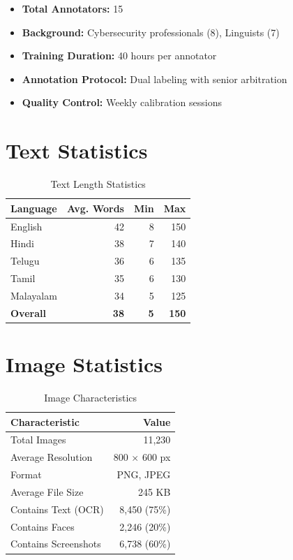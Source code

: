 \documentclass[10pt,a4paper]{article}
\begin{document}
\begin{itemize}
\item \textbf{Total Annotators:} 15
\item \textbf{Background:} Cybersecurity professionals (8), Linguists (7)
\item \textbf{Training Duration:} 40 hours per annotator
\item \textbf{Annotation Protocol:} Dual labeling with senior arbitration
\item \textbf{Quality Control:} Weekly calibration sessions
\end{itemize}

\section{Text Statistics}

\begin{table}[h]
\centering
\caption{Text Length Statistics}
\begin{tabular}{lrrr}
\toprule
\rowcolor{headerblue}
\textbf{Language} & \textbf{Avg. Words} & \textbf{Min} & \textbf{Max} \\
\midrule
English   & 42 & 8  & 150 \\
Hindi     & 38 & 7  & 140 \\
Telugu    & 36 & 6  & 135 \\
Tamil     & 35 & 6  & 130 \\
Malayalam & 34 & 5  & 125 \\
\midrule
\textbf{Overall} & \textbf{38} & \textbf{5} & \textbf{150} \\
\bottomrule
\end{tabular}
\end{table}

\section{Image Statistics}

\begin{table}[h]
\centering
\caption{Image Characteristics}
\begin{tabular}{lr}
\toprule
\rowcolor{headerblue}
\textbf{Characteristic} & \textbf{Value} \\
\midrule
Total Images              & 11,230 \\
Average Resolution        & 800 $\times$ 600 px \\
Format                    & PNG, JPEG \\
Average File Size         & 245 KB \\
Contains Text (OCR)       & 8,450 (75\%) \\
Contains Faces            & 2,246 (20\%) \\
Contains Screenshots      & 6,738 (60\%) \\
\bottomrule
\end{tabular}
\end{table}
\end{document}
